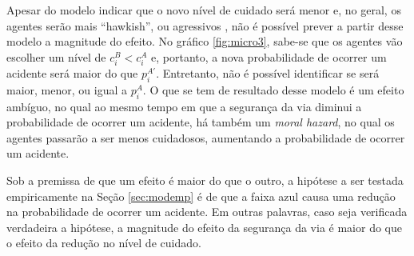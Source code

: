 Apesar do modelo indicar que o novo nível de cuidado será menor e, no geral, os agentes serão mais ``hawkish'', ou agressivos \cite{pedersen2003moral}, não é possível prever a partir desse modelo a magnitude do efeito. No gráfico \ref{fig:micro3}, sabe-se que os agentes vão escolher um nível de $c_i^B<c_i^A$ e, portanto, a nova probabilidade de ocorrer um acidente será maior do que $p_i^{A'}$. Entretanto, não é possível identificar se será maior, menor, ou igual a $p_i^A$. O que se tem de resultado desse modelo é um efeito ambíguo, no qual ao mesmo tempo em que a segurança da via diminui a probabilidade de ocorrer um acidente, há também um \textit{moral hazard}, no qual os agentes passarão a ser menos cuidadosos, aumentando a probabilidade de ocorrer um acidente.

Sob a premissa de que um efeito é maior do que o outro, a hipótese a ser testada empiricamente na Seção \ref{sec:modemp} é de que a faixa azul causa uma redução na probabilidade de ocorrer um acidente. Em outras palavras, caso seja verificada verdadeira a hipótese, a magnitude do efeito da segurança da via é maior do que o efeito da redução no nível de cuidado. 
